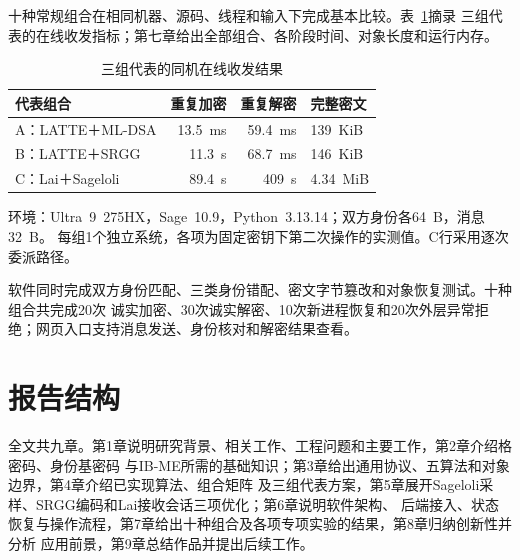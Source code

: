 十种常规组合在相同机器、源码、线程和输入下完成基本比较。表~\ref{tab:work-highlights}摘录
三组代表的在线收发指标；第七章给出全部组合、各阶段时间、对象长度和运行内存。

\begin{table}[H]
\centering\small
\caption{三组代表的同机在线收发结果}
\label{tab:work-highlights}
\begin{tabularx}{\textwidth}{@{}p{}rrX@{}}
\toprule
\rowcolor{black!8} 代表组合 & 重复加密 & 重复解密 & 完整密文 \\
\midrule
A：LATTE＋ML-DSA & 13.5~ms & 59.4~ms & 139~KiB \\
B：LATTE＋SRGG & 11.3~s & 68.7~ms & 146~KiB \\
C：Lai＋Sageloli & 89.4~s & 409~s & 4.34~MiB \\
\bottomrule
\end{tabularx}
\begin{minipage}{.98\textwidth}\footnotesize
环境：Ultra~9~275HX，Sage~10.9，Python~3.13.14；双方身份各64~B，消息32~B。
每组1个独立系统，各项为固定密钥下第二次操作的实测值。C行采用逐次委派路径。
\end{minipage}
\end{table}

软件同时完成双方身份匹配、三类身份错配、密文字节篡改和对象恢复测试。十种组合共完成20次
诚实加密、30次诚实解密、10次新进程恢复和20次外层异常拒绝；网页入口支持消息发送、身份核对和解密结果查看。


\section{报告结构}

全文共九章。第1章说明研究背景、相关工作、工程问题和主要工作，第2章介绍格密码、身份基密码
与IB-ME所需的基础知识；第3章给出通用协议、五算法和对象边界，第4章介绍已实现算法、组合矩阵
及三组代表方案，第5章展开Sageloli采样、SRGG编码和Lai接收会话三项优化；第6章说明软件架构、
后端接入、状态恢复与操作流程，第7章给出十种组合及各项专项实验的结果，第8章归纳创新性并分析
应用前景，第9章总结作品并提出后续工作。
